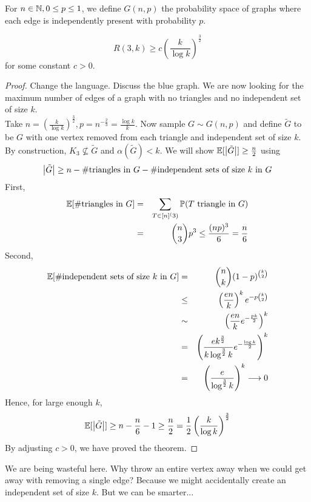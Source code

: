 \documentclass{article}
\begin{document}
\begin{defi}
  For $n \in \mathbb N, 0 \le p \le 1$, we define $G(n, p)$ the probability space of graphs where each edge is independently present with probability $p$.
\end{defi}

\begin{thm}[Erd\H os]
  $$R(3, k) \ge c\left(\frac k{\log k}\right)^{\frac 32}$$
  for some constant $c > 0$.
\end{thm}
\begin{proof}
  Change the language. Discuss the blue graph. We are now looking for the maximum number of edges of a graph with no triangles and no independent set of size $k$. \\
  Take $n = \left(\frac k{\log k}\right)^{\frac 32}, p = n^{-\frac 23} = \frac{\log k}k$. Now sample $G \sim G(n, p)$ and define $\tilde G$ to be $G$ with one vertex removed from each triangle and independent set of size $k$. By construction, $K_3 \not\subseteq \tilde G$ and $\alpha(\tilde G) < k$. We will show $\mathbb E[\left\lvert \tilde G\right\rvert] \ge \frac n2$ using
  $$\left\lvert \tilde G\right\rvert \ge n - \#\text{triangles in } G - \#\text{independent sets of size $k$ in } G$$
  First,
  \begin{eqnarray*}
    \mathbb E[\#\text{triangles in } G]
    & = & \sum_{T \in [n]^(3)} \mathbb P(T \text { triangle in } G) \\
    & = & \binom n3 p^3 \le \frac{(np)^3}6 = \frac n6
  \end{eqnarray*}
  Second,
  \begin{eqnarray*}
    \mathbb E[\#\text{independent sets of size $k$ in } G]
    & = & \binom nk (1 - p)^{\binom k2} \\
    & \le & \left(\frac{en}k\right)^k e^{-p\binom k2} \\
    & \sim & \left(\frac{en}k e^{-\frac{pk}2}\right)^k \\
    & = & \left(\frac{ek^{\frac 32}}{k\log^{\frac 32} k} e^{-\frac{\log k}2}\right)^k \\
    & = & \left(\frac e{\log^{\frac 32} k}\right)^k \longrightarrow 0
  \end{eqnarray*}
  Hence, for large enough $k$,
  $$\mathbb E[\left\lvert \tilde G\right\rvert] \ge n - \frac n6 - 1 \ge \frac n2 = \frac 12 \left(\frac k{\log k}\right)^{\frac 32}$$
  By adjusting $c > 0$, we have proved the theorem.
\end{proof}

We are being wasteful here. Why throw an entire vertex away when we could get away with removing a single edge? Because we might accidentally create an independent set of size $k$. But we can be smarter...
\end{document}
